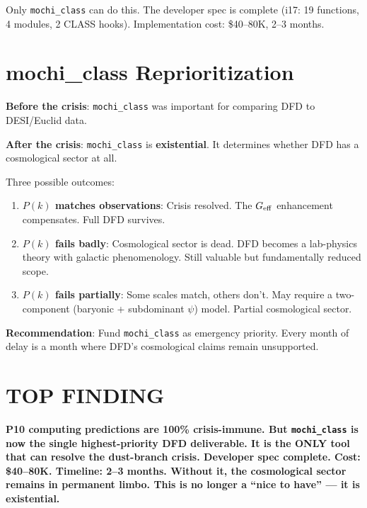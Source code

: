 \documentclass[11pt]{article}
\begin{document}
Only \texttt{mochi\_class} can do this. The developer spec is complete
(i17: 19 functions, 4 modules, 2 CLASS hooks). Implementation cost:
\$40--80K, 2--3 months.

\section{mochi\_class Reprioritization}

\textbf{Before the crisis}: \texttt{mochi\_class} was important for
comparing DFD to DESI/Euclid data.

\textbf{After the crisis}: \texttt{mochi\_class} is \textbf{existential}.
It determines whether DFD has a cosmological sector at all.

Three possible outcomes:
\begin{enumerate}
\item \textbf{$P(k)$ matches observations}: Crisis resolved. The
  $G_{\rm eff}$ enhancement compensates. Full DFD survives.
\item \textbf{$P(k)$ fails badly}: Cosmological sector is dead.
  DFD becomes a lab-physics theory with galactic phenomenology.
  Still valuable but fundamentally reduced scope.
\item \textbf{$P(k)$ fails partially}: Some scales match, others don't.
  May require a two-component (baryonic + subdominant $\psi$) model.
  Partial cosmological sector.
\end{enumerate}

\textbf{Recommendation}: Fund \texttt{mochi\_class} as emergency priority.
Every month of delay is a month where DFD's cosmological claims remain
unsupported.

\section*{TOP FINDING}

\begin{tcolorbox}[colback=blue!5!white, colframe=blue!70!black]
\textbf{P10 computing predictions are 100\% crisis-immune. But
\texttt{mochi\_class} is now the single highest-priority DFD deliverable.
It is the ONLY tool that can resolve the dust-branch crisis. Developer
spec complete. Cost: \$40--80K. Timeline: 2--3 months. Without it, the
cosmological sector remains in permanent limbo. This is no longer a
``nice to have'' --- it is existential.}
\end{tcolorbox}
\end{document}
